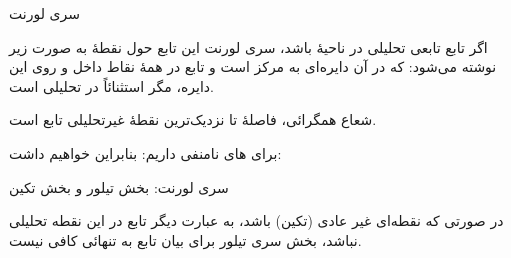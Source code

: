 \EMhold


\begin{EMtheorem}{سری لورنت}

اگر تابع  تابعی تحلیلی در ناحیهٔ  باشد، سری لورنت این تابع حول نقطهٔ  به صورت زیر نوشته می‌شود:
که در آن  دایره‌ای به مرکز  است و تابع در همهٔ نقاط داخل و روی این دایره، مگر استثنائاً در  تحلیلی است.

شعاع همگرائی، فاصلهٔ  تا نزدیک‌ترین نقطهٔ غیرتحلیلی تابع  است.

\end{EMtheorem}

برای  های نامنفی داریم:
بنابراین خواهیم داشت:

\begin{EMimportant}{سری لورنت: بخش تیلور و بخش تکین}


\end{EMimportant}

در صورتی که  نقطه‌ای غیر عادی (تکین) باشد، به عبارت دیگر تابع در این نقطه تحلیلی نباشد، بخش سری تیلور برای بیان تابع به تنهائی کافی نیست.

\EMhold


